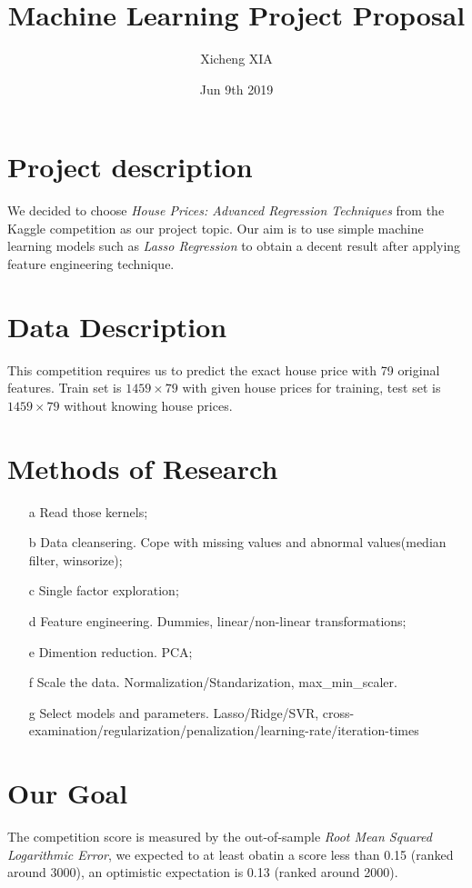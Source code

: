 \documentclass{article}
\title{Machine Learning Project Proposal}
\date{Jun 9th 2019}
\author{Xicheng XIA}
\begin{document}
	\maketitle
\section{Project description}
We decided to choose \textit{House Prices: Advanced Regression Techniques} from the Kaggle competition as our project topic. Our aim is to use simple machine learning models such as \textit{Lasso Regression} to obtain a decent result after applying feature engineering technique.\\

\section{Data Description}
This competition requires us to predict the exact house price with 79 original features. Train set is $1459\times 79$ with given house prices for training, test set is $1459\times 79$ without knowing house prices.

\section{Methods of Research}
\begin{itemize}
	\item[a] Read those kernels;
	\item[b] Data cleansering. Cope with missing values and abnormal values(median filter, winsorize);
	\item[c] Single factor exploration;
	\item[d] Feature engineering. Dummies, linear/non-linear transformations;
	\item[e] Dimention reduction. PCA;
	\item[f] Scale the data. Normalization/Standarization, max\_min\_scaler.
	\item[g] Select models and parameters. Lasso/Ridge/SVR, cross-examination/regularization/penalization/learning-rate/iteration-times
\end{itemize}


\section{Our Goal}
The competition score is measured by the out-of-sample \textit{Root Mean Squared Logarithmic Error}, we expected to at least obatin a score less than 0.15 (ranked around 3000), an optimistic expectation is 0.13 (ranked around 2000).
\end{document}
